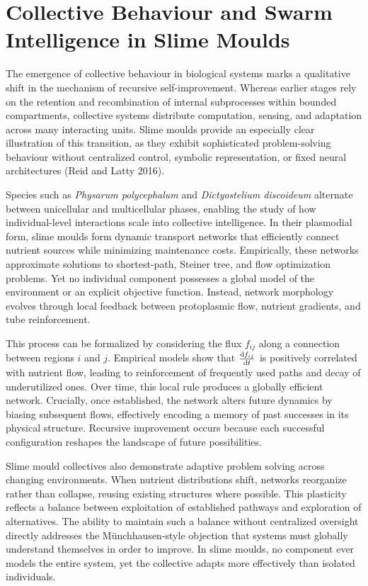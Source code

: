 \documentclass[11pt]{article}
\begin{document}
\section{Collective Behaviour and Swarm Intelligence in Slime Moulds}

The emergence of collective behaviour in biological systems marks a qualitative shift in the mechanism of recursive self-improvement. Whereas earlier stages rely on the retention and recombination of internal subprocesses within bounded compartments, collective systems distribute computation, sensing, and adaptation across many interacting units. Slime moulds provide an especially clear illustration of this transition, as they exhibit sophisticated problem-solving behaviour without centralized control, symbolic representation, or fixed neural architectures (Reid and Latty 2016).

Species such as \emph{Physarum polycephalum} and \emph{Dictyostelium discoideum} alternate between unicellular and multicellular phases, enabling the study of how individual-level interactions scale into collective intelligence. In their plasmodial form, slime moulds form dynamic transport networks that efficiently connect nutrient sources while minimizing maintenance costs. Empirically, these networks approximate solutions to shortest-path, Steiner tree, and flow optimization problems. Yet no individual component possesses a global model of the environment or an explicit objective function. Instead, network morphology evolves through local feedback between protoplasmic flow, nutrient gradients, and tube reinforcement.

This process can be formalized by considering the flux $f_{ij}$ along a connection between regions $i$ and $j$. Empirical models show that $\dv{f_{ij}}{t}$ is positively correlated with nutrient flow, leading to reinforcement of frequently used paths and decay of underutilized ones. Over time, this local rule produces a globally efficient network. Crucially, once established, the network alters future dynamics by biasing subsequent flows, effectively encoding a memory of past successes in its physical structure. Recursive improvement occurs because each successful configuration reshapes the landscape of future possibilities.

Slime mould collectives also demonstrate adaptive problem solving across changing environments. When nutrient distributions shift, networks reorganize rather than collapse, reusing existing structures where possible. This plasticity reflects a balance between exploitation of established pathways and exploration of alternatives. The ability to maintain such a balance without centralized oversight directly addresses the Münchhausen-style objection that systems must globally understand themselves in order to improve. In slime moulds, no component ever models the entire system, yet the collective adapts more effectively than isolated individuals.
\end{document}
